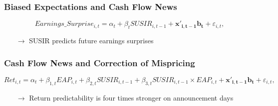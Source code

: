 \documentclass{beamer}
\begin{document}
\begin{frame}
		\frametitle{Biased Expectations and Cash Flow News}
\vspace*{-.3cm}
	\begin{equation}\nonumber
	Earnings\_Surprise_{i,t}=\alpha_t+\beta_t  SUSIR_{i,t-1} +  \mathbf{x'_{i,t-1}} \mathbf{b_t}+ \varepsilon_{i,t},
	\label{eq:surprise}
	\end{equation}
\vspace*{-0.9cm}
\begin{table}[htbp]
  	\resizebox{0.7\textwidth}{!}{
	 	
	\label{tab:surp}%
	}
\end{table} 
\vspace*{-.3cm}
\begin{itemize}
\item[$\rightarrow$] SUSIR predicts future earnings surprises
\end{itemize}
\end{frame}



		\begin{frame}
		\frametitle{Cash Flow News and Correction of Mispricing}
		\vspace*{-0.3cm}
{\scriptsize				  
		\begin{equation} \nonumber 
	Ret_{i,t}=\alpha_t+ \beta_{1,t}  EAP_{i,t} + \beta_{2,t}  SUSIR_{i,t-1} + \beta_{3,t}  SUSIR_{i,t-1} \times EAP_{i,t} + \mathbf{x'_{i,t-1}} \mathbf{b_t}+ \varepsilon_{i,t},
	\label{eq:EAP_daily}
	\end{equation}
}
		\vspace*{-0.5cm}
\begin{table}[htbp]
  \centering
  \footnotesize
  	  \resizebox{0.75\textwidth}{!}{	 	
	 	
	\label{tab:EAP_daily}%
	}
\end{table}
\begin{itemize}
\item[$\rightarrow$] Return predictability is four times stronger on announcement days
\end{itemize}
	\end{frame}

\end{document}
